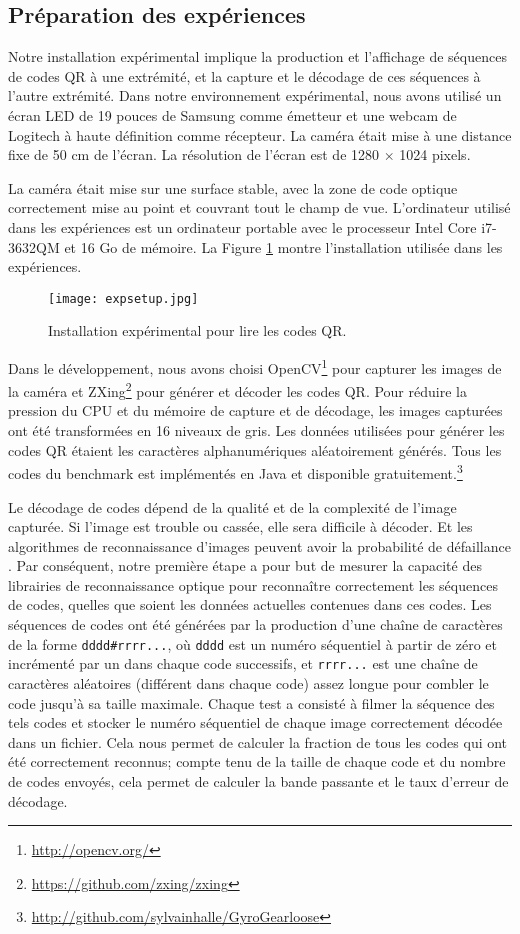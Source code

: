 \subsection{Préparation des expériences}

Notre installation expérimental implique la production et l'affichage de séquences de codes QR à une extrémité, et la capture et le décodage de ces séquences à l'autre extrémité. Dans notre environnement expérimental, nous avons utilisé un écran LED de 19 pouces de Samsung comme émetteur et une webcam de Logitech à haute définition comme récepteur. La caméra était mise à une distance fixe de 50 cm de l'écran. La résolution de l'écran est de 1280 $\times$ 1024 pixels.

La caméra était mise sur une surface stable, avec la zone de code optique correctement mise au point et couvrant tout le champ de vue. L'ordinateur utilisé dans les expériences est un ordinateur portable avec le processeur Intel Core i7-3632QM et 16 Go de mémoire. La Figure \ref{fig:qr:setup} montre l'installation utilisée dans les expériences.

\begin{figure}
\centering
\texttt{[image: expsetup.jpg]}
\caption{Installation expérimental pour lire les codes QR.}
\label{fig:qr:setup}
\end{figure}

Dans le développement, nous avons choisi OpenCV\footnote{\url{http://opencv.org/}} pour capturer les images de la caméra et ZXing\footnote{\url{https://github.com/zxing/zxing}} pour générer et décoder les codes QR. Pour réduire la pression du CPU et du mémoire de capture et de décodage, les images capturées ont été transformées en 16 niveaux de gris. Les données utilisées pour générer les codes QR étaient les caractères alphanumériques aléatoirement générés. Tous les codes du benchmark est implémentés en Java et disponible gratuitement.\footnote {\url{http://github.com/sylvainhalle/GyroGearloose}}

Le décodage de codes dépend de la qualité et de la complexité de l'image capturée. Si l'image est trouble ou cassée, elle sera difficile à décoder. Et les algorithmes de reconnaissance d'images peuvent avoir la probabilité de défaillance \citep{adel2006}. Par conséquent, notre première étape a pour but de mesurer la capacité des librairies de reconnaissance optique pour reconnaître correctement les séquences de codes, quelles que soient les données actuelles contenues dans ces codes. Les séquences de codes ont été générées par la production d'une chaîne de caractères de la forme \verb+dddd#rrrr...+, où \verb+dddd+ est un numéro séquentiel à partir de zéro et incrémenté par un dans chaque code successifs, et \verb+rrrr...+ est une chaîne de caractères aléatoires (différent dans chaque code) assez longue pour combler le code jusqu'à sa taille maximale. Chaque test a consisté à filmer la séquence des tels codes et stocker le numéro séquentiel de chaque image correctement décodée dans un fichier. Cela nous permet de calculer la fraction de tous les codes qui ont été correctement reconnus; compte tenu de la taille de chaque code et du nombre de codes envoyés, cela permet de calculer la bande passante et le taux d'erreur de décodage.

